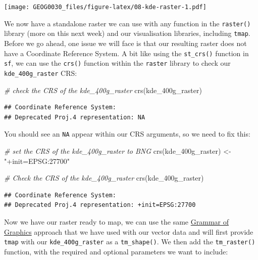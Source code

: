 \documentclass[
]{book}
\newenvironment{Shaded}{\begin{snugshade}}{\end{snugshade}}
\newcommand{\CommentTok}[1]{\textcolor[rgb]{0.56,0.35,0.01}{\textit{#1}}}
\newcommand{\FunctionTok}[1]{\textcolor[rgb]{0.00,0.00,0.00}{#1}}
\newcommand{\NormalTok}[1]{#1}
\newcommand{\OtherTok}[1]{\textcolor[rgb]{0.56,0.35,0.01}{#1}}
\newcommand{\StringTok}[1]{\textcolor[rgb]{0.31,0.60,0.02}{#1}}
\begin{document}
\texttt{[image: GEOG0030\_files/figure-latex/08-kde-raster-1.pdf]}

We now have a standalone raster we can use with any function in the \texttt{raster()} library (more on this next week) and our visualisation libraries, including \texttt{tmap}. Before we go ahead, one issue we will face is that our resulting raster does not have a Coordinate Reference System. A bit like using the \texttt{st\_crs()} function in \texttt{sf}, we can use the \texttt{crs()} function within the \texttt{raster} library to check our \texttt{kde\_400g\_raster} CRS:

\begin{Shaded}
\begin{Highlighting}[]
\CommentTok{\# check the CRS of the kde\_400g\_raster}
\FunctionTok{crs}\NormalTok{(kde\_400g\_raster)}
\end{Highlighting}
\end{Shaded}

\begin{verbatim}
## Coordinate Reference System:
## Deprecated Proj.4 representation: NA
\end{verbatim}

You should see an \texttt{NA} appear within our CRS arguments, so we need to fix this:

\begin{Shaded}
\begin{Highlighting}[]
\CommentTok{\# set the CRS of the kde\_400g\_raster to BNG}
\FunctionTok{crs}\NormalTok{(kde\_400g\_raster) }\OtherTok{\textless{}{-}} \StringTok{"+init=EPSG:27700"}

\CommentTok{\# Check the CRS of the kde\_400g\_raster}
\FunctionTok{crs}\NormalTok{(kde\_400g\_raster)}
\end{Highlighting}
\end{Shaded}

\begin{verbatim}
## Coordinate Reference System:
## Deprecated Proj.4 representation: +init=EPSG:27700
\end{verbatim}

Now we have our raster ready to map, we can use the same \href{https://towardsdatascience.com/a-comprehensive-guide-to-the-grammar-of-graphics-for-effective-visualization-of-multi-dimensional-1f92b4ed4149}{Grammar of Graphics} approach that we have used with our vector data and will first provide \texttt{tmap} with our \texttt{kde\_400g\_raster} as a \texttt{tm\_shape()}. We then add the \texttt{tm\_raster()} function, with the required and optional parameters we want to include:
\end{document}
